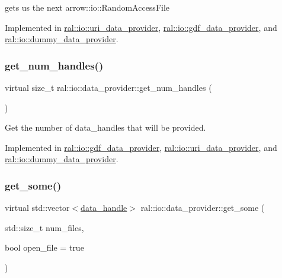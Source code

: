 gets us the next arrow\+::io\+::\+Random\+Access\+File 

Implemented in \hyperlink{classral_1_1io_1_1uri__data__provider_a189c193c14fdabc3dd84dca1385688d0}{ral\+::io\+::uri\+\_\+data\+\_\+provider}, \hyperlink{classral_1_1io_1_1gdf__data__provider_a6770bc3c6f51365ecd3c7cc16babb7ff}{ral\+::io\+::gdf\+\_\+data\+\_\+provider}, and \hyperlink{classral_1_1io_1_1dummy__data__provider_a0e0f9cf9d1c6b4878236746e6c83c108}{ral\+::io\+::dummy\+\_\+data\+\_\+provider}.

\mbox{\label{classral_1_1io_1_1data__provider_a00ff9cc629a869d7b7e6a67c90056749}} 
\subsubsection{\texorpdfstring{get\+\_\+num\+\_\+handles()}{get\_num\_handles()}}
{\footnotesize\ttfamily virtual size\+\_\+t ral\+::io\+::data\+\_\+provider\+::get\+\_\+num\+\_\+handles (\begin{DoxyParamCaption}{ }\end{DoxyParamCaption})\hspace{0.3cm}{\ttfamily [pure virtual]}}

Get the number of data\+\_\+handles that will be provided. 

Implemented in \hyperlink{classral_1_1io_1_1gdf__data__provider_a681eb5bce251e2dc1895a2941d41931f}{ral\+::io\+::gdf\+\_\+data\+\_\+provider}, \hyperlink{classral_1_1io_1_1uri__data__provider_a89a2e8bd07ce00025d62e877ae56a871}{ral\+::io\+::uri\+\_\+data\+\_\+provider}, and \hyperlink{classral_1_1io_1_1dummy__data__provider_a05a005b12166902815522d924af87aed}{ral\+::io\+::dummy\+\_\+data\+\_\+provider}.

\mbox{\label{classral_1_1io_1_1data__provider_ae65c935f9812ac3321b0c814fa4a5548}} 
\subsubsection{\texorpdfstring{get\+\_\+some()}{get\_some()}}
{\footnotesize\ttfamily virtual std\+::vector$<$\hyperlink{structral_1_1io_1_1data__handle}{data\+\_\+handle}$>$ ral\+::io\+::data\+\_\+provider\+::get\+\_\+some (\begin{DoxyParamCaption}\item[{std\+::size\+\_\+t}]{num\+\_\+files,  }\item[{bool}]{open\+\_\+file = {\ttfamily true} }\end{DoxyParamCaption})\hspace{0.3cm}{\ttfamily [pure virtual]}}

